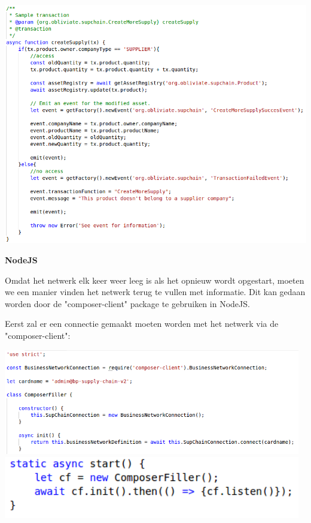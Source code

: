 \documentclass[fleqn,a4paper,12pt]{book}
\begin{document}
\begin{center}
	\includegraphics[width=14cm]{img/logic-example}\\[1cm]
\end{center}

\textbf{NodeJS}

Omdat het netwerk elk keer weer leeg is als het opnieuw wordt opgestart, moeten we een manier vinden het netwerk terug te vullen met informatie. Dit kan gedaan worden door de "composer-client" package te gebruiken in NodeJS.

Eerst zal er een connectie gemaakt moeten worden met het netwerk via de "composer-client":
\begin{center}
	\includegraphics[width=13cm]{img/composer-start}\\[1cm]
	\includegraphics[width=13cm]{img/composer-connect}\\[1cm]
\end{center}
\end{document}
